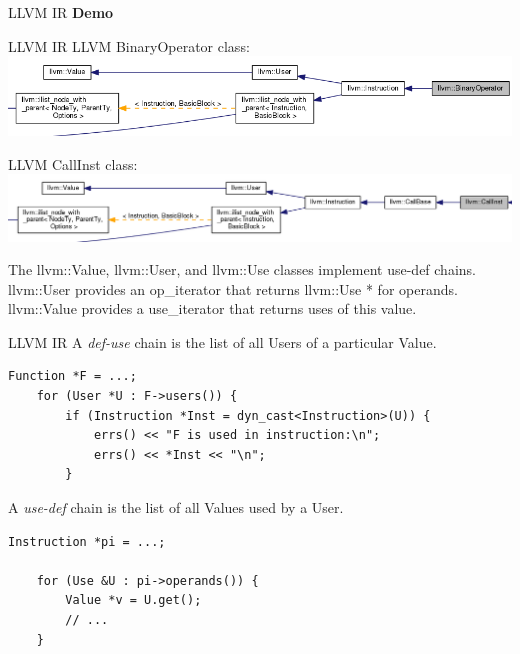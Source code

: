 \documentclass{beamer}
\begin{document}
\begin{frame}{LLVM IR}
    \centering\huge\bfseries
    Demo
\end{frame}

\begin{frame}{LLVM IR}
    LLVM BinaryOperator class:
    \includegraphics[width=\textwidth]{images/llvm_binop.png}

    LLVM CallInst class:
    \includegraphics[width=\textwidth]{images/llvm_callinst.png}

    The llvm::Value, llvm::User, and llvm::Use classes implement use-def chains. \\
    \footnotesize
    llvm::User provides an op\_iterator that returns llvm::Use * for operands. \\
    llvm::Value provides a use\_iterator that returns uses of this value. \\
\end{frame}

\begin{frame}[fragile]{LLVM IR}
    A \emph{def-use} chain is the list of all Users of a particular Value.
    \begin{lstlisting}[gobble=4]
    Function *F = ...;
    for (User *U : F->users()) {
        if (Instruction *Inst = dyn_cast<Instruction>(U)) {
            errs() << "F is used in instruction:\n";
            errs() << *Inst << "\n";
        }
    \end{lstlisting}

    \vspace{1em}
    A \emph{use-def} chain is the list of all Values used by a User.
    \begin{lstlisting}[gobble=4]
    Instruction *pi = ...;

    for (Use &U : pi->operands()) {
        Value *v = U.get();
        // ...
    }
    \end{lstlisting}
\end{frame}
\end{document}

